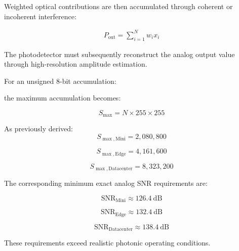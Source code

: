\documentclass[journal]{IEEEtran}
\begin{document}
\begin{center}
\label{eq:analog_encoding}
\end{center}

Weighted optical contributions are then accumulated through coherent or incoherent interference:

\begin{align}
P_{\mathrm{out}} = \sum_{i=1}^{N} w_i x_i
\label{eq:analog_mac}
\end{align}

The photodetector must subsequently reconstruct the analog output value through high-resolution amplitude estimation.

For an unsigned 8-bit accumulation:

\begin{center}
\end{center}

the maximum accumulation becomes:

\begin{equation}
S_{\max} = N \times 255 \times 255
\end{equation}

As previously derived:
\begin{equation}
S_{\max, \mathrm{Mini}} = 2,080,800
\end{equation}

\begin{equation}
S_{\max, \mathrm{Edge}} = 4,161,600
\end{equation}

\begin{equation}
S_{\max, \mathrm{Datacenter}} = 8,323,200
\end{equation}

The corresponding minimum exact analog SNR requirements are:

\begin{equation}
\mathrm{SNR}_{\mathrm{Mini}} \approx 126.4~\mathrm{dB}
\end{equation}

\begin{equation}
\mathrm{SNR}_{\mathrm{Edge}} \approx 132.4~\mathrm{dB}
\end{equation}

\begin{equation}
\mathrm{SNR}_{\mathrm{Datacenter}} \approx 138.4~\mathrm{dB}
\end{equation}

These requirements exceed realistic photonic operating conditions.
\end{document}
